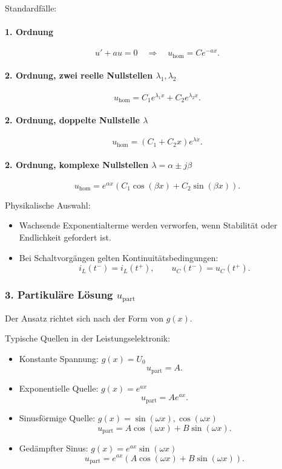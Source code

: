 Standardfälle:

\paragraph{1. Ordnung}
\[
u' + a u = 0 
\quad \Rightarrow \quad 
u_{\mathrm{hom}} = C e^{-a x}.
\]

\paragraph{2. Ordnung, zwei reelle Nullstellen $\lambda_1,\lambda_2$}
\[
u_{\mathrm{hom}} = C_1 e^{\lambda_1 x} + C_2 e^{\lambda_2 x}.
\]

\paragraph{2. Ordnung, doppelte Nullstelle $\lambda$}
\[
u_{\mathrm{hom}} = (C_1 + C_2 x) e^{\lambda x}.
\]

\paragraph{2. Ordnung, komplexe Nullstellen $\lambda = \alpha \pm j \beta$}
\[
u_{\mathrm{hom}} = e^{\alpha x} \left( C_1 \cos(\beta x) + C_2 \sin(\beta x) \right).
\]

Physikalische Auswahl:
\begin{itemize}
    \item Wachsende Exponentialterme werden verworfen, wenn Stabilität oder Endlichkeit gefordert ist.
    \item Bei Schaltvorgängen gelten Kontinuitätsbedingungen:
    \[
    i_L(t^-) = i_L(t^+), 
    \qquad
    u_C(t^-) = u_C(t^+).
    \]
\end{itemize}


\subsubsection{3. Partikuläre Lösung $u_{\mathrm{part}}$}

Der Ansatz richtet sich nach der Form von $g(x)$.

Typische Quellen in der Leistungselektronik:

\begin{itemize}
    \item Konstante Spannung: $g(x) = U_0$
    \[
    u_{\mathrm{part}} = A.
    \]
    \item Exponentielle Quelle: $g(x) = e^{a x}$
    \[
    u_{\mathrm{part}} = A e^{a x}.
    \]
    \item Sinusförmige Quelle: $g(x) = \sin(\omega x), \cos(\omega x)$
    \[
    u_{\mathrm{part}} = A \cos(\omega x) + B \sin(\omega x).
    \]
    \item Gedämpfter Sinus: $g(x) = e^{a x} \sin(\omega x)$
    \[
    u_{\mathrm{part}} = e^{a x} \left( A \cos(\omega x) + B \sin(\omega x) \right).
    \]
\end{itemize}

